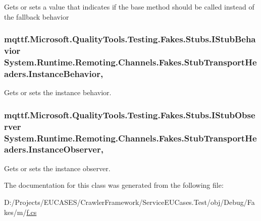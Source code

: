 Gets or sets a value that indicates if the base method should be called instead of the fallback behavior

\hypertarget{class_system_1_1_runtime_1_1_remoting_1_1_channels_1_1_fakes_1_1_stub_transport_headers_a2d96cc26b63181255eae06741080b7de}{
\subsubsection[{Instance\-Behavior}]{\setlength{\rightskip}{0pt plus 5cm}mqttf.\-Microsoft.\-Quality\-Tools.\-Testing.\-Fakes.\-Stubs.\-I\-Stub\-Behavior System.\-Runtime.\-Remoting.\-Channels.\-Fakes.\-Stub\-Transport\-Headers.\-Instance\-Behavior\hspace{0.3cm}{\ttfamily [get]}, {\ttfamily [set]}}}\label{class_system_1_1_runtime_1_1_remoting_1_1_channels_1_1_fakes_1_1_stub_transport_headers_a2d96cc26b63181255eae06741080b7de}


Gets or sets the instance behavior.

\hypertarget{class_system_1_1_runtime_1_1_remoting_1_1_channels_1_1_fakes_1_1_stub_transport_headers_a3635eb4a465019d86e8a3e3fb7fb7947}{
\subsubsection[{Instance\-Observer}]{\setlength{\rightskip}{0pt plus 5cm}mqttf.\-Microsoft.\-Quality\-Tools.\-Testing.\-Fakes.\-Stubs.\-I\-Stub\-Observer System.\-Runtime.\-Remoting.\-Channels.\-Fakes.\-Stub\-Transport\-Headers.\-Instance\-Observer\hspace{0.3cm}{\ttfamily [get]}, {\ttfamily [set]}}}\label{class_system_1_1_runtime_1_1_remoting_1_1_channels_1_1_fakes_1_1_stub_transport_headers_a3635eb4a465019d86e8a3e3fb7fb7947}


Gets or sets the instance observer.



The documentation for this class was generated from the following file\-:\begin{DoxyCompactItemize}
\item 
D\-:/\-Projects/\-E\-U\-C\-A\-S\-E\-S/\-Crawler\-Framework/\-Service\-E\-U\-Cases.\-Test/obj/\-Debug/\-Fakes/m/\hyperlink{m_2f_8cs}{f.\-cs}\end{DoxyCompactItemize}
